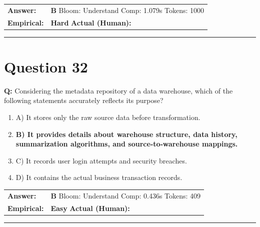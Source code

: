 \documentclass[9pt]{article}
\begin{document}
\begin{tabular}{@{}l p{10.5cm}@{}}
\textbf{Answer:} & \textbf{B} \hspace{1em} Bloom: Understand \hspace{1em} Comp: 1.079s \hspace{1em} Tokens: 1000 \\
\textbf{Empirical:} & \textbf{Hard} \hspace{1em} \textbf{Actual (Human):} \underline{\hspace{5cm}}
\end{tabular}

\vspace{0.2cm}
\rule{\textwidth}{0.4pt}
\vspace{0.2cm}


\section*{Question 32}

\textbf{Q:} Considering the metadata repository of a data warehouse, which of the following statements accurately reflects its purpose?

\begin{enumerate}[label=\textbf{\alph{*})}, nosep]
    \item A) It stores only the raw source data before transformation.
    \item \textbf{B) It provides details about warehouse structure, data history, summarization algorithms, and source‑to‑warehouse mappings.} %
    \item C) It records user login attempts and security breaches.
    \item D) It contains the actual business transaction records.

\end{enumerate}

\begin{tabular}{@{}l p{10.5cm}@{}}
\textbf{Answer:} & \textbf{B} \hspace{1em} Bloom: Understand \hspace{1em} Comp: 0.436s \hspace{1em} Tokens: 409 \\
\textbf{Empirical:} & \textbf{Easy} \hspace{1em} \textbf{Actual (Human):} \underline{\hspace{5cm}}
\end{tabular}

\vspace{0.2cm}
\rule{\textwidth}{0.4pt}
\vspace{0.2cm}
\end{document}
